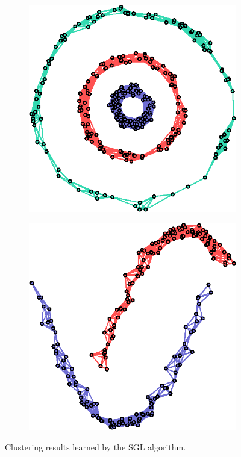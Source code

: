 \begin{figure}[!htb]
\begin{subfigure}[b]{0.23\textwidth}
    \end{subfigure}
    ~
    \begin{subfigure}[b]{0.23\textwidth}
        \includegraphics[width=\textwidth]{clusters/circles3.eps}
    \end{subfigure}
    \begin{subfigure}[b]{0.23\textwidth}
        \includegraphics[width=\textwidth]{clusters/worms.eps}
    \end{subfigure}
    \caption{Clustering results learned by the \textsf{SGL} algorithm.}
    \label{fig:clusters}
\end{figure}

